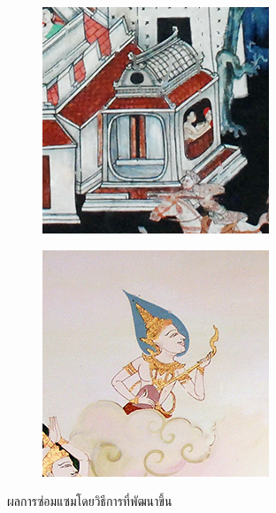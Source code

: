 \documentclass[xcolor=dvipsnames, xetex,serif]{beamer}
\numberwithin{equation}{section}
\begin{document}
\begin{frame}
\begin{figure}[H]
\begin{subfigure}{0.15\linewidth}
            \end{subfigure}
            \begin{subfigure}{0.15\linewidth}
                \centering
                \includegraphics[width=0.9\linewidth]{images/result_ex4/multisplitbergman_case04.png}			
            \end{subfigure}
            \begin{subfigure}{0.15\linewidth}
                \centering
                \includegraphics[width=0.9\linewidth]{images/result_ex4/multisplitbergman_case05.png}			
            \end{subfigure}
            \caption{ผลการซ่อมแซมโดยวิธีการที่พัฒนาขึ้น}
        \end{figure}
    \end{frame}
\end{document}

